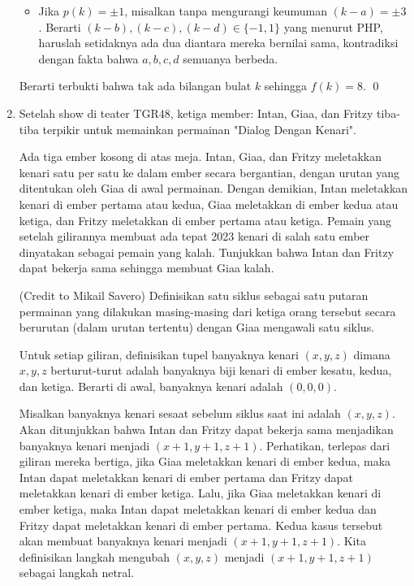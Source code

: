 \documentclass[11pt]{scrartcl}
\begin{document}
\begin{enumerate}[resume]
\begin{solusi}
\begin{itemize}
        \item Jika $p(k)=\pm 1$, misalkan tanpa mengurangi keumuman $(k-a)=\pm3$. Berarti $(k-b), (k-c), (k-d) \in \{-1,1\}$ yang menurut PHP, haruslah setidaknya ada dua diantara mereka bernilai sama, kontradiksi dengan fakta bahwa $a,b,c,d$ semuanya berbeda.
        \end{itemize}
        
        Berarti terbukti bahwa tak ada bilangan bulat $k$ sehingga $f(k)=8$. \qed
    \end{solusi}

    \newpage
    \item Setelah show di teater TGR48, ketiga member: Intan, Giaa, dan Fritzy tiba-tiba terpikir untuk memainkan permainan "Dialog Dengan Kenari".
    
    Ada tiga ember kosong di atas meja. Intan, Giaa, dan Fritzy meletakkan kenari satu per satu ke dalam ember secara bergantian, dengan urutan yang ditentukan oleh Giaa di awal permainan. Dengan demikian, Intan meletakkan kenari di ember pertama atau kedua, Giaa meletakkan di ember kedua atau ketiga, dan Fritzy meletakkan di ember pertama atau ketiga. Pemain yang setelah gilirannya membuat ada tepat 2023 kenari di salah satu ember dinyatakan sebagai pemain yang kalah. Tunjukkan bahwa Intan dan Fritzy dapat bekerja sama sehingga membuat Giaa kalah.
    \begin{solusi}
        (Credit to Mikail Savero)
        Definisikan satu siklus sebagai satu putaran permainan yang dilakukan masing-masing dari ketiga orang tersebut secara berurutan (dalam urutan tertentu) dengan Giaa mengawali satu siklus.

        Untuk setiap giliran, definisikan tupel banyaknya kenari $(x,y,z)$ dimana $x,y,z$ berturut-turut adalah banyaknya biji kenari di ember kesatu, kedua, dan ketiga. Berarti di awal, banyaknya kenari adalah $(0,0,0)$. 

        Misalkan banyaknya kenari sesaat sebelum siklus saat ini adalah $(x,y,z)$. Akan ditunjukkan bahwa Intan dan Fritzy dapat bekerja sama menjadikan banyaknya kenari menjadi $(x+1,y+1,z+1)$. Perhatikan, terlepas dari giliran mereka bertiga, jika Giaa meletakkan kenari di ember kedua, maka Intan dapat meletakkan kenari di ember pertama dan Fritzy dapat meletakkan kenari di ember ketiga. Lalu, jika Giaa meletakkan kenari di ember ketiga, maka Intan dapat meletakkan kenari di ember kedua dan Fritzy dapat meletakkan kenari di ember pertama. Kedua kasus tersebut akan membuat banyaknya kenari menjadi $(x+1, y+1, z+1)$. Kita definisikan langkah mengubah $(x,y,z)$ menjadi $(x+1,y+1,z+1)$ sebagai langkah netral.


\end{solusi}
\end{enumerate}
\end{document}
